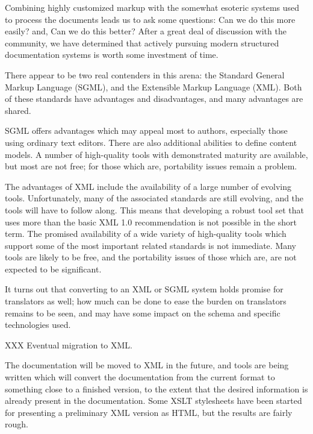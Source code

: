 \documentclass{howto}
\begin{document}
    Combining highly customized markup with the somewhat esoteric
    systems used to process the documents leads us to ask some
    questions:  Can we do this more easily?  and, Can we do this
    better?  After a great deal of discussion with the community, we
    have determined that actively pursuing modern structured
    documentation systems is worth some investment of time.

    There appear to be two real contenders in this arena: the Standard
    General Markup Language (SGML), and the Extensible Markup Language
    (XML).  Both of these standards have advantages and disadvantages,
    and many advantages are shared.

    SGML offers advantages which may appeal most to authors,
    especially those using ordinary text editors.  There are also
    additional abilities to define content models.  A number of
    high-quality tools with demonstrated maturity are available, but
    most are not free; for those which are, portability issues remain
    a problem.

    The advantages of XML include the availability of a large number
    of evolving tools.  Unfortunately, many of the associated
    standards are still evolving, and the tools will have to follow
    along.  This means that developing a robust tool set that uses
    more than the basic XML 1.0 recommendation is not possible in the
    short term.  The promised availability of a wide variety of
    high-quality tools which support some of the most important
    related standards is not immediate.  Many tools are likely to be
    free, and the portability issues of those which are, are not
    expected to be significant.

    It turns out that converting to an XML or SGML system holds
    promise for translators as well; how much can be done to ease the
    burden on translators remains to be seen, and may have some impact
    on the schema and specific technologies used.

    XXX Eventual migration to XML.

    The documentation will be moved to XML in the future, and tools
    are being written which will convert the documentation from the
    current format to something close to a finished version, to the
    extent that the desired information is already present in the
    documentation.  Some XSLT stylesheets have been started for
    presenting a preliminary XML version as HTML, but the results are
    fairly rough.
\end{document}
